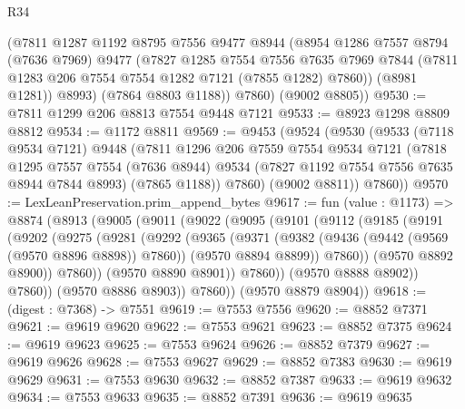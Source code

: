 \begin{lexlean}{R34}
\begin{coremodule}
          (@7811
            @1287
            @1192
            @8795
            @7556
            @9477
            @8944
            (@8954
              @1286
              @7557
              @8794
              (@7636 @7969)
              @9477
              (@7827
                @1285
                @7554
                @7556
                @7635
                @7969
                @7844
                (@7811 @1283 @206 @7554 @7554 @1282 @7121 (@7855 @1282) @7860))
              (@8981 @1281))
            @8993)
          (@7864 @8803 @1188))
        @7860)
      (@9002 @8805))
@9530 := @7811 @1299 @206 @8813 @7554 @9448 @7121
@9533 := @8923 @1298 @8809 @8812
@9534 := @1172 @8811
@9569 := @9453
    (@9524
      (@9530
        (@9533
          (@7118 @9534 @7121)
          @9448
          (@7811
            @1296
            @206
            @7559
            @7554
            @9534
            @7121
            (@7818
              @1295
              @7557
              @7554
              (@7636 @8944)
              @9534
              (@7827 @1192 @7554 @7556 @7635 @8944 @7844 @8993)
              (@7865 @1188))
            @7860)
          (@9002 @8811))
        @7860))
@9570 := LexLeanPreservation.prim_append_bytes
@9617 := fun (value : @1173) =>
  @8874
    (@8913
      (@9005
        (@9011
          (@9022
            (@9095
              (@9101
                (@9112
                  (@9185
                    (@9191
                      (@9202
                        (@9275
                          (@9281
                            (@9292
                              (@9365
                                (@9371
                                  (@9382
                                    (@9436 (@9442 (@9569 (@9570 @8896 @8898)) @7860))
                                    (@9570 @8894 @8899))
                                  @7860))
                              (@9570 @8892 @8900))
                            @7860))
                        (@9570 @8890 @8901))
                      @7860))
                  (@9570 @8888 @8902))
                @7860))
            (@9570 @8886 @8903))
          @7860))
      (@9570 @8879 @8904))
@9618 := (digest : @7368) -> @7551
@9619 := @7553 @7556
@9620 := @8852 @7371
@9621 := @9619 @9620
@9622 := @7553 @9621
@9623 := @8852 @7375
@9624 := @9619 @9623
@9625 := @7553 @9624
@9626 := @8852 @7379
@9627 := @9619 @9626
@9628 := @7553 @9627
@9629 := @8852 @7383
@9630 := @9619 @9629
@9631 := @7553 @9630
@9632 := @8852 @7387
@9633 := @9619 @9632
@9634 := @7553 @9633
@9635 := @8852 @7391
@9636 := @9619 @9635

\end{coremodule}
\end{lexlean}
